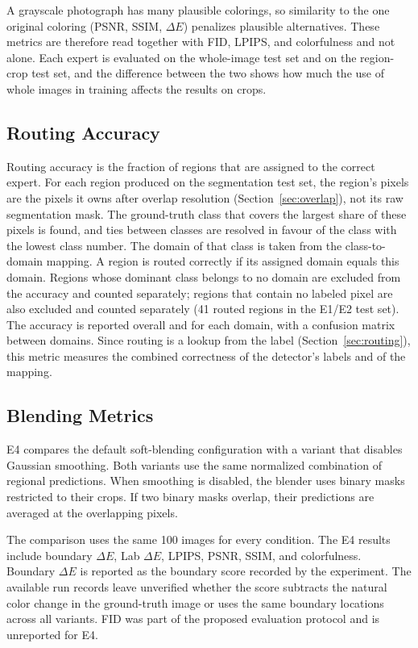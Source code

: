 \documentclass{FastFyp}
\begin{document}
A grayscale photograph has many plausible colorings, so similarity to the one original coloring (PSNR, SSIM, $\Delta E$) penalizes plausible alternatives. These metrics are therefore read together with FID, LPIPS, and colorfulness and not alone. Each expert is evaluated on the whole-image test set and on the region-crop test set, and the difference between the two shows how much the use of whole images in training affects the results on crops.

\subsection{Routing Accuracy}

Routing accuracy is the fraction of regions that are assigned to the correct expert. For each region produced on the segmentation test set, the region's pixels are the pixels it owns after overlap resolution (Section~\ref{sec:overlap}), not its raw segmentation mask. The ground-truth class that covers the largest share of these pixels is found, and ties between classes are resolved in favour of the class with the lowest class number. The domain of that class is taken from the class-to-domain mapping. A region is routed correctly if its assigned domain equals this domain. Regions whose dominant class belongs to no domain are excluded from the accuracy and counted separately; regions that contain no labeled pixel are also excluded and counted separately (41 routed regions in the E1/E2 test set). The accuracy is reported overall and for each domain, with a confusion matrix between domains. Since routing is a lookup from the label (Section~\ref{sec:routing}), this metric measures the combined correctness of the detector's labels and of the mapping.
\subsection{Blending Metrics}

E4 compares the default soft-blending configuration with a variant that
disables Gaussian smoothing. Both variants use the same normalized
combination of regional predictions. When smoothing is disabled, the
blender uses binary masks restricted to their crops. If two binary masks
overlap, their predictions are averaged at the overlapping pixels.

The comparison uses the same 100 images for every condition. The E4
results include boundary $\Delta E$, Lab $\Delta E$, LPIPS, PSNR, SSIM,
and colorfulness. Boundary $\Delta E$ is reported as the boundary score
recorded by the experiment. The available run records leave unverified
whether the score subtracts the natural color change in the ground-truth
image or uses the same boundary locations across all variants. FID was
part of the proposed evaluation protocol and is unreported for E4.
\end{document}
